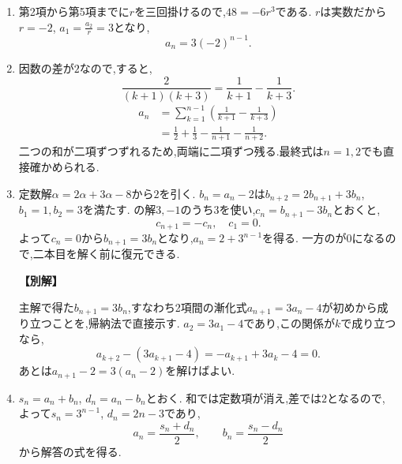 \begin{enumerate}[label=\textbf{問\arabic*.},leftmargin=3.8em,format=\bookitemlink{practice-basic}{solution}{problem}]
  \item {}\BookMathLayout{}{\\}
    第2項から第5項までに$r$を三回掛けるので,$48=-6r^3$である.
    $r$は実数だから$r=-2$, $a_1=\frac{a_2}{r}=3$となり,
    \[
      a_n=3(-2)^{n-1}.
    \]

  \item {}\BookMathLayout{}{\\}
    因数の差が$2$なので,すると,
    \[
      \frac2{(k+1)(k+3)}=\frac1{k+1}-\frac1{k+3}.
    \]
    \[
      \begin{aligned}
        a_n&=\sum_{k=1}^{n-1}\left(\frac1{k+1}-\frac1{k+3}\right)\\
        &=\frac12+\frac13-\frac1{n+1}-\frac1{n+2}.
      \end{aligned}
    \]
    二つの和が二項ずつずれるため,両端に二項ずつ残る.最終式は$n=1,2$でも直接確かめられる.

  \item {}\BookMathLayout{}{\\}
    定数解$\alpha=2\alpha+3\alpha-8$から$2$を引く.
    $b_n=a_n-2$は$b_{n+2}=2b_{n+1}+3b_n$, $b_1=1,b_2=3$を満たす.
    の解$3,-1$のうち$3$を使い,$c_n=b_{n+1}-3b_n$とおくと,
    \[
      c_{n+1}=-c_n,\quad c_1=0.
    \]
    よって$c_n=0$から$b_{n+1}=3b_n$となり,$a_n=2+3^{n-1}$を得る.
    一方のが0になるので,二本目を解く前に復元できる.
    \par\smallskip\noindent\textbf{【別解】}\par
    主解で得た$b_{n+1}=3b_n$,すなわち2項間の漸化式$a_{n+1}=3a_n-4$が初めから成り立つことを,帰納法で直接示す.
    $a_2=3a_1-4$であり,この関係が$k$で成り立つなら,
    \[
      a_{k+2}-(3a_{k+1}-4)=-a_{k+1}+3a_k-4=0.
    \]
    あとは$a_{n+1}-2=3(a_n-2)$を解けばよい.

  \item {}\BookMathLayout{}{\\}
    $s_n=a_n+b_n$, $d_n=a_n-b_n$とおく.
    和では定数項が消え,差では$2$となるので,
    \BookMathLayout{\[
        s_{n+1}=3s_n,\quad d_{n+1}=d_n+2,
        \quad s_1=1,\ d_1=-1.
      \]}{\[
        \begin{aligned}
          s_{n+1}&=3s_n,\quad d_{n+1}=d_n+2,\\
          s_1&=1,\quad d_1=-1.
        \end{aligned}
      \]}
    よって$s_n=3^{n-1}$, $d_n=2n-3$であり,
    \[
      a_n=\frac{s_n+d_n}2,\qquad b_n=\frac{s_n-d_n}2
    \]
    から解答の式を得る.


\end{enumerate}
